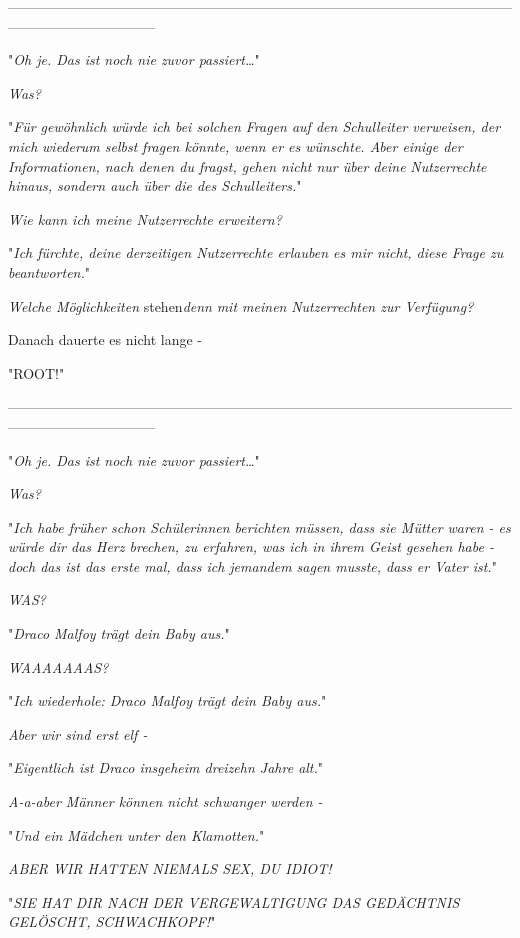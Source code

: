 {--------------------------------------------------------------------------------------------------------------------------------------------

"\emph{Oh je. Das ist noch nie zuvor passiert…}"

\emph{Was?}

"\emph{Für gewöhnlich würde ich bei solchen Fragen auf den Schulleiter verweisen, der mich} \emph{wiederum selbst} \emph{fragen könnte, wenn er es wünschte. Aber einige der Informationen, nach denen du fragst, gehen nicht nur über deine} \emph{Nutzerrechte} \emph{hinaus, sondern auch über die des Schulleiters.}"

\emph{Wie kann ich meine Nutzerrechte} \emph{erweitern?}

"\emph{Ich fürchte, deine derzeitigen Nutzerrechte erlauben es mir nicht, diese Frage zu beantworten.}"

\emph{Welche Möglichkeiten} stehen\emph{denn} \emph{mit meinen} \emph{Nutzerrechten zur Verfügung?}

Danach dauerte es nicht lange -

"ROOT!"

--------------------------------------------------------------------------------------------------------------------------------------------

"\emph{Oh je. Das ist noch nie zuvor passiert…}"

\emph{Was?}

"\emph{Ich habe früher schon Schülerinnen berichten müssen, dass sie Mütter waren - es würde dir das Herz brechen, zu erfahren, was ich in ihrem Geist gesehen habe - doch das ist das erste mal, dass ich jemandem sagen musste, dass er Vater ist.}"

\emph{WAS?}

"\emph{Draco Malfoy trägt dein Baby aus.}"

\emph{WAAAAAAAS?}

"\emph{Ich wiederhole: Draco Malfoy trägt dein Baby aus.}"

\emph{Aber wir sind erst elf -}

"\emph{Eigentlich ist Draco insgeheim dreizehn Jahre alt.}"

\emph{A-a-aber Männer können nicht schwanger werden -}

"\emph{Und ein Mädchen unter den Klamotten.}"

\emph{ABER WIR HATTEN NIEMALS SEX, DU IDIOT!}

"\emph{SIE HAT DIR NACH DER VERGEWALTIGUNG DAS GEDÄCHTNIS GELÖSCHT, SCHWACHKOPF!}"

}

